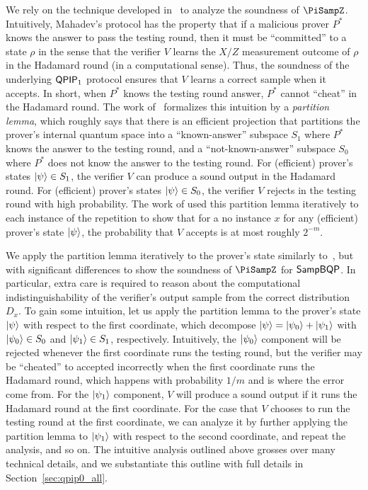 We rely on the technique developed in~\cite{arXiv:ChiaChungYam19} to analyze the soundness of $\PiSampZ$. Intuitively, Mahadev's protocol has the property that if a malicious prover $P^*$ knows the answer to pass the testing round, then it must be ``committed'' to a state $\rho$ in the sense that the verifier $V$ learns the $X/Z$ measurement outcome of $\rho$ in the Hadamard round (in a computational sense). Thus, the soundness of the underlying $\operatorname{\mathsf{QPIP}}_1$ protocol ensures that $V$ learns a correct sample when it accepts. In short, when $P^*$ knows the testing round answer,  $P^*$ cannot ``cheat'' in the Hadamard round. The work of~\cite{arXiv:ChiaChungYam19} formalizes this intuition by a \emph{partition lemma}, which roughly says that there is an efficient projection that partitions the prover's internal quantum space into a ``known-answer'' subspace $S_1$ where $P^*$ knows the answer to the testing round, and a ``not-known-answer'' subspace $S_0$ where $P^*$ does not know the answer to the testing round. For (efficient) prover's states $\ket{\psi} \in S_1$, the verifier $V$ can produce a sound output in the Hadamard round. For (efficient) prover's states $\ket{\psi} \in S_0$, the verifier $V$ rejects in the testing round with high probability. The work of \cite{arXiv:ChiaChungYam19} used this partition lemma iteratively to each instance of the repetition to show that for a no instance $x$ for any (efficient) prover's state $\ket{\psi}$, the probability that $V$ accepts is at most roughly $2^{-m}$.

We apply the partition lemma iteratively to the prover's state  similarly to~\cite{arXiv:ChiaChungYam19}, but with significant differences to show the soundness of $\PiSampZ$ for $\operatorname{\mathsf{SampBQP}}$. In particular, extra care is required to reason about the computational indistinguishability of the verifier's output sample from the correct distribution $D_x$. To gain some intuition, let us apply the partition lemma to the prover's state $\ket{\psi}$ with respect to the first coordinate, which decompose $\ket{\psi} = \ket{\psi_0} + \ket{\psi_1}$ with $\ket{\psi_0} \in S_0$ and  $\ket{\psi_1} \in S_1$, respectively. Intuitively, the $\ket{\psi_0}$ component will be rejected whenever the first coordinate runs the testing round, but the verifier may be ``cheated'' to accepted incorrectly when the first coordinate runs the Hadamard round, which happens with probability $1/m$ and is where the error come from. For the $\ket{\psi_1}$ component, $V$ will produce a sound output if it runs the Hadamard round at the first coordinate. For the case that $V$ chooses to run the testing round at the first coordinate, we can analyze it by further applying the partition lemma to $\ket{\psi_1}$ with respect to the second coordinate, and repeat the analysis, and so on. 
%
The intuitive analysis outlined above grosses over many technical details, and we substantiate this outline with full details in  
Section~\ref{sec:qpip0_all}.

